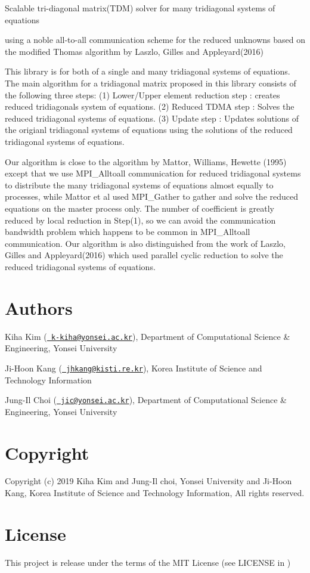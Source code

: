 Scalable tri-\/diagonal matrix(\+T\+D\+M) solver for many tridiagonal systems of equations

using a noble all-\/to-\/all communication scheme for the reduced unknowns based on the modified Thomas algorithm by Laszlo, Gilles and Appleyard(2016)

This library is for both of a single and many tridiagonal systems of equations. The main algorithm for a tridiagonal matrix proposed in this library consists of the following three steps\+: (1) Lower/\+Upper element reduction step \+: creates reduced tridiagonals system of equations. (2) Reduced T\+D\+MA step \+: Solves the reduced tridiagonal systems of equations. (3) Update step \+: Updates solutions of the origianl tridiagonal systems of equations using the solutions of the reduced tridiagonal systems of equations.

Our algorithm is close to the algorithm by Mattor, Williams, Hewette (1995) except that we use M\+P\+I\+\_\+\+Alltoall communication for reduced tridiagonal systems to distribute the many tridiagonal systems of equations almost equally to processes, while Mattor et al used M\+P\+I\+\_\+\+Gather to gather and solve the reduced equations on the master process only. The number of coefficient is greatly reduced by local reduction in Step(1), so we can avoid the communication bandwidth problem which happens to be common in M\+P\+I\+\_\+\+Alltoall communication. Our algorithm is also distinguished from the work of Laszlo, Gilles and Appleyard(2016) which used parallel cyclic reduction to solve the reduced tridiagonal systems of equations.

\section*{Authors}


\begin{DoxyItemize}
\item Kiha Kim (\href{mailto:k-kiha@yonsei.ac.kr}{\texttt{ k-\/kiha@yonsei.\+ac.\+kr}}), Department of Computational Science \& Engineering, Yonsei University
\item Ji-\/\+Hoon Kang (\href{mailto:jhkang@kisti.re.kr}{\texttt{ jhkang@kisti.\+re.\+kr}}), Korea Institute of Science and Technology Information
\item Jung-\/\+Il Choi (\href{mailto:jic@yonsei.ac.kr}{\texttt{ jic@yonsei.\+ac.\+kr}}), Department of Computational Science \& Engineering, Yonsei University
\end{DoxyItemize}

\section*{Copyright}

Copyright (c) 2019 Kiha Kim and Jung-\/\+Il choi, Yonsei University and Ji-\/\+Hoon Kang, Korea Institute of Science and Technology Information, All rights reserved.

\section*{License}

This project is release under the terms of the M\+IT License (see L\+I\+C\+E\+N\+SE in ) 